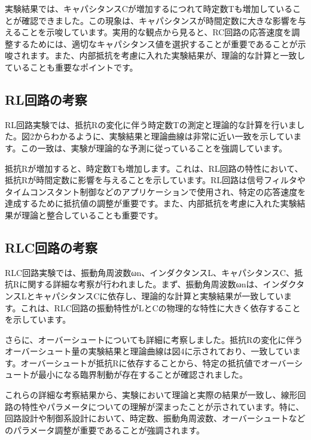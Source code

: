\documentclass[a4paper,11pt,xelatex,ja=standard]{bxjsarticle}
\begin{document}
実験結果では、キャパシタンスCが増加するにつれて時定数Tも増加していることが確認できました。この現象は、キャパシタンスが時間定数に大きな影響を与えることを示唆しています。実用的な観点から見ると、RC回路の応答速度を調整するためには、適切なキャパシタンス値を選択することが重要であることが示唆されます。また、内部抵抗を考慮に入れた実験結果が、理論的な計算と一致していることも重要なポイントです。

\subsection{RL回路の考察}

RL回路実験では、抵抗Rの変化に伴う時定数Tの測定と理論的な計算を行いました。図2からわかるように、実験結果と理論曲線は非常に近い一致を示しています。この一致は、実験が理論的な予測に従っていることを強調しています。

抵抗Rが増加すると、時定数Tも増加します。これは、RL回路の特性において、抵抗Rが時間定数に影響を与えることを示しています。RL回路は信号フィルタやタイムコンスタント制御などのアプリケーションで使用され、特定の応答速度を達成するために抵抗値の調整が重要です。また、内部抵抗を考慮に入れた実験結果が理論と整合していることも重要です。

\subsection{RLC回路の考察}

RLC回路実験では、振動角周波数ωn、インダクタンスL、キャパシタンスC、抵抗Rに関する詳細な考察が行われました。まず、振動角周波数ωnは、インダクタンスLとキャパシタンスCに依存し、理論的な計算と実験結果が一致しています。これは、RLC回路の振動特性がLとCの物理的な特性に大きく依存することを示しています。

さらに、オーバーシュートについても詳細に考察しました。抵抗Rの変化に伴うオーバーシュート量の実験結果と理論曲線は図4に示されており、一致しています。オーバーシュートが抵抗Rに依存することから、特定の抵抗値でオーバーシュートが最小になる臨界制動が存在することが確認されました。

これらの詳細な考察結果から、実験において理論と実際の結果が一致し、線形回路の特性やパラメータについての理解が深まったことが示されています。特に、回路設計や制御系設計において、時定数、振動角周波数、オーバーシュートなどのパラメータ調整が重要であることが強調されます。
\end{document}
